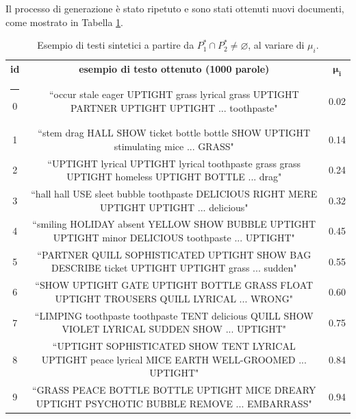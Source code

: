 \documentclass[12pt]{report}
\makeatletter
\theoremstyle{definition}
\newcommand{\thickhline}{%
    \noalign {\ifnum 0=`}\fi \hrule height 1pt
    \futurelet \reserved@a \@xhline
}
\let\emptyset\varnothing
\makeatother
\begin{document}
Il processo di generazione è stato ripetuto e sono stati ottenuti nuovi documenti, come mostrato in Tabella \ref{generationexample2}.
\begin{table}[!h]
\centering
\begin{adjustbox}{max width=\textwidth}
 \begin{tabular}{|c|c|c|} 
 \hline
\textbf{id} & \textbf{esempio di testo ottenuto (1000 parole)} & $\bm{\mu_i}$ 
\\ [0.5ex] 
 \thickhline
0 & ``occur stale eager UPTIGHT grass lyrical grass UPTIGHT PARTNER UPTIGHT UPTIGHT ... toothpaste" & 0.02 \\
1 & ``stem drag HALL SHOW ticket bottle bottle SHOW UPTIGHT stimulating mice ... GRASS" & 0.14  \\
2 & ``UPTIGHT lyrical UPTIGHT lyrical toothpaste grass grass UPTIGHT homeless UPTIGHT BOTTLE ... drag" & 0.24 \\
3 & ``hall hall USE sleet bubble toothpaste DELICIOUS RIGHT MERE UPTIGHT UPTIGHT ... delicious" & 0.32 \\
4 & ``smiling HOLIDAY absent YELLOW SHOW BUBBLE UPTIGHT UPTIGHT minor DELICIOUS toothpaste ... UPTIGHT" & 0.45 \\
5 & ``PARTNER QUILL SOPHISTICATED UPTIGHT SHOW BAG DESCRIBE ticket UPTIGHT UPTIGHT grass ... sudden" & 0.55 \\
6 & ``SHOW UPTIGHT GATE UPTIGHT BOTTLE GRASS FLOAT UPTIGHT TROUSERS QUILL LYRICAL ... WRONG" & 0.60  \\
7 & ``LIMPING toothpaste toothpaste TENT delicious QUILL SHOW VIOLET LYRICAL SUDDEN SHOW ... UPTIGHT" & 0.75 \\
8 & ``UPTIGHT SOPHISTICATED SHOW TENT LYRICAL UPTIGHT peace lyrical MICE EARTH WELL-GROOMED ... UPTIGHT" & 0.84 \\
9 & ``GRASS PEACE BOTTLE BOTTLE UPTIGHT MICE DREARY UPTIGHT PSYCHOTIC BUBBLE REMOVE ... EMBARRASS" & 0.94 \\
 \hline
\end{tabular}
\end{adjustbox}
\caption{Esempio di testi sintetici a partire da $P_{1}^{*} \cap P_{2}^{*} \neq \emptyset$, al variare di $\mu_i$.}
\label{generationexample2}
\end{table}
\end{document}
